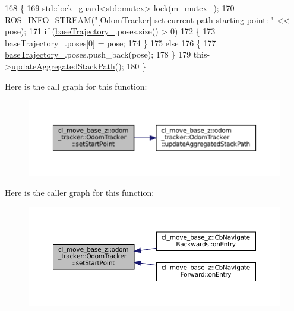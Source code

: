 \begin{DoxyCode}
168         \{
169             std::lock\_guard<std::mutex> lock(\hyperlink{classcl__move__base__z_1_1odom__tracker_1_1OdomTracker_aa371639e1eee269273dec8d3ab9dba0f}{m\_mutex\_});
170             ROS\_INFO\_STREAM(\textcolor{stringliteral}{"[OdomTracker] set current path starting point: "} << pose);
171             \textcolor{keywordflow}{if} (\hyperlink{classcl__move__base__z_1_1odom__tracker_1_1OdomTracker_a466d18a86df049f0f680e043bb5ea91f}{baseTrajectory\_}.poses.size() > 0)
172             \{
173                 \hyperlink{classcl__move__base__z_1_1odom__tracker_1_1OdomTracker_a466d18a86df049f0f680e043bb5ea91f}{baseTrajectory\_}.poses[0] = pose;
174             \}
175             \textcolor{keywordflow}{else}
176             \{
177                 \hyperlink{classcl__move__base__z_1_1odom__tracker_1_1OdomTracker_a466d18a86df049f0f680e043bb5ea91f}{baseTrajectory\_}.poses.push\_back(pose);
178             \}
179             this->\hyperlink{classcl__move__base__z_1_1odom__tracker_1_1OdomTracker_a7922f1e1e688a2ed62d32d9914985a9f}{updateAggregatedStackPath}();
180         \}
\end{DoxyCode}
Here is the call graph for this function\+:
\nopagebreak
\begin{figure}[H]
\begin{center}
\leavevmode
\includegraphics[width=350pt]{classcl__move__base__z_1_1odom__tracker_1_1OdomTracker_a9f4989c6353022c2ec3b0546c09bf3bc_cgraph}
\end{center}
\end{figure}
Here is the caller graph for this function\+:
\nopagebreak
\begin{figure}[H]
\begin{center}
\leavevmode
\includegraphics[width=350pt]{classcl__move__base__z_1_1odom__tracker_1_1OdomTracker_a9f4989c6353022c2ec3b0546c09bf3bc_icgraph}
\end{center}
\end{figure}
